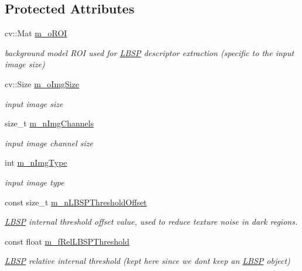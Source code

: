 \subsection*{Protected Attributes}
\begin{DoxyCompactItemize}
\item 
cv\+::\+Mat \mbox{\hyperlink{class_background_subtractor_l_b_s_p_a53fe98bd2489d95de5292467145901e9}{m\+\_\+o\+R\+OI}}
\begin{DoxyCompactList}\small\item\em background model R\+OI used for \mbox{\hyperlink{class_l_b_s_p}{L\+B\+SP}} descriptor extraction (specific to the input image size) \end{DoxyCompactList}\item 
cv\+::\+Size \mbox{\hyperlink{class_background_subtractor_l_b_s_p_a732d5e6ae35fb0e858cadb3af5ce08a2}{m\+\_\+o\+Img\+Size}}
\begin{DoxyCompactList}\small\item\em input image size \end{DoxyCompactList}\item 
size\+\_\+t \mbox{\hyperlink{class_background_subtractor_l_b_s_p_ab3467ebee2c5d1249061ccd704cc0584}{m\+\_\+n\+Img\+Channels}}
\begin{DoxyCompactList}\small\item\em input image channel size \end{DoxyCompactList}\item 
int \mbox{\hyperlink{class_background_subtractor_l_b_s_p_a7d2f52ecd5ff56e42da86f97e0ad93b5}{m\+\_\+n\+Img\+Type}}
\begin{DoxyCompactList}\small\item\em input image type \end{DoxyCompactList}\item 
const size\+\_\+t \mbox{\hyperlink{class_background_subtractor_l_b_s_p_a209eb6aaa34e8ad8e565e79f85404e24}{m\+\_\+n\+L\+B\+S\+P\+Threshold\+Offset}}
\begin{DoxyCompactList}\small\item\em \mbox{\hyperlink{class_l_b_s_p}{L\+B\+SP}} internal threshold offset value, used to reduce texture noise in dark regions. \end{DoxyCompactList}\item 
const float \mbox{\hyperlink{class_background_subtractor_l_b_s_p_ad759c645b14e9b16bf3940cae862df32}{m\+\_\+f\+Rel\+L\+B\+S\+P\+Threshold}}
\begin{DoxyCompactList}\small\item\em \mbox{\hyperlink{class_l_b_s_p}{L\+B\+SP}} relative internal threshold (kept here since we don\textquotesingle{}t keep an \mbox{\hyperlink{class_l_b_s_p}{L\+B\+SP}} object) \end{DoxyCompactList}\item 

\end{DoxyCompactItemize}
